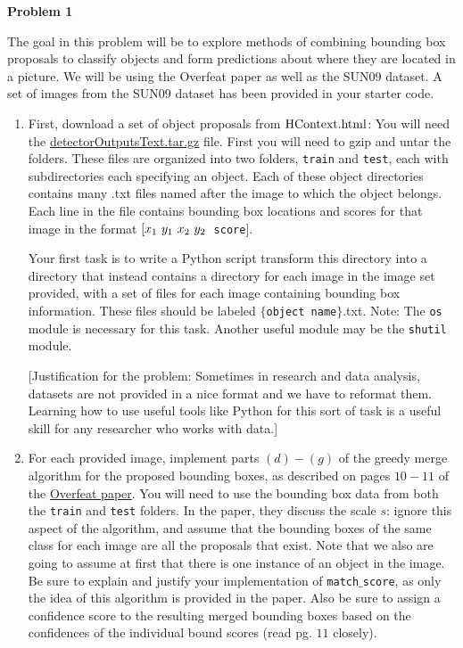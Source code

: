 \documentclass[12pt]{article}
\newcommand{\txt}[1]
{\textnormal{#1}}
\newcommand{\courseheader}
{
\bf{COS 598C Spring 2015}
}
\newcommand{\authorheader}
{
Kiran Vodrahalli and Yanchen Wang
}
\newcommand{\kiranhead}
{
 \lhead{\courseheader}
 \rhead{\authorheader}
}
\newcommand{\probnum}[1]
{\large {\bf Problem {#1}}}
\begin{document}
\pagestyle{fancy}

\kiranhead

\probnum{1}

The goal in this problem will be to explore methods of combining bounding box proposals to classify objects and form predictions about where they are located in a picture. We will be using the Overfeat paper as well as the SUN09 dataset. A set of images from the SUN09 dataset has been provided in your starter code. 

\begin{enumerate}

\item First, download a set of object proposals from \href{http://people.csail.mit.edu/myungjin/HContext.html}{$\txt{HContext.html}$}: You will need the \href{http://groups.csail.mit.edu/vision/Hcontext/data/detectorOutputsText.tar.gz}{detectorOutputsText.tar.gz} file. First you will need to gzip and untar the folders. These files are organized into two folders, \texttt{train} and \texttt{test}, each with subdirectories each specifying an object. Each of these object directories contains many .txt files named after the image to which the object belongs. Each line in the file contains bounding box locations and scores for that image in the format $[x_1 \txt{ } y_1 \txt{ } x_2 \txt{ } y_2 $\texttt{ score}$]$. 

Your first task is to write a Python script transform this directory into a directory that instead contains a directory for each image in the image set provided, with a set of files for each image containing bounding box information. These files should be labeled $\{$\texttt{object name}$\}$.txt. Note: The \texttt{os} module is necessary for this task. Another useful module may be the \texttt{shutil} module.

[Justification for the problem: Sometimes in research and data analysis, datasets are not provided in a nice format and we have to reformat them. Learning how to use useful tools like Python for this sort of task is a useful skill for any researcher who works with data.]

\item For each provided image, implement parts $(d)-(g)$ of the greedy merge algorithm for the proposed bounding boxes, as described on pages $10-11$ of the \href{http://arxiv.org/pdf/1312.6229v4.pdf}{Overfeat paper}. You will need to use the bounding box data from both the \texttt{train} and \texttt{test} folders. In the paper, they discuss the scale $s$: ignore this aspect of the algorithm, and assume that the bounding boxes of the same class for each image are all the proposals that exist. Note that we also are going to assume at first that there is one instance of an object in the image. Be sure to explain and justify your implementation of \texttt{match$\_$score}, as only the idea of this algorithm is provided in the paper. Also be sure to assign a confidence score to the resulting merged bounding boxes based on the confidences of the individual bound scores (read pg. $11$ closely). 


\end{enumerate}
\end{document}
